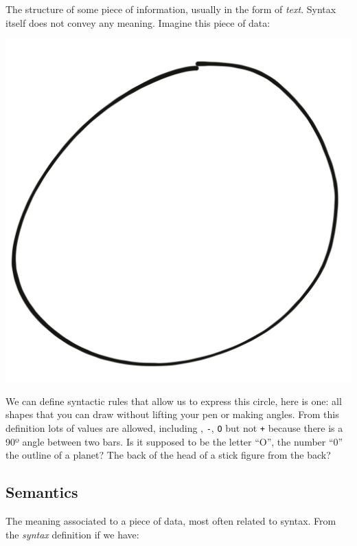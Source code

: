 \documentclass[
]{article}
\begin{document}
The structure of some piece of information, usually in the form of
\emph{text}. Syntax itself does not convey any meaning. Imagine this
piece of data:

\includegraphics{Zero.jpg}

We can define syntactic rules that allow us to express this circle, here
is one: all shapes that you can draw without lifting your pen or making
angles. From this definition lots of values are allowed, including
\texttt{\textbar{}}, \texttt{-}, \texttt{O} but not \texttt{+} because
there is a 90º angle between two bars. Is it supposed to be the letter
``O'', the number ``0'' the outline of a planet? The back of the head of
a stick figure from the back?

\hypertarget{semantics-1}{%
\subsection{Semantics}\label{semantics-1}}

The meaning associated to a piece of data, most often related to syntax.
From the \emph{syntax} definition if we have:
\end{document}
